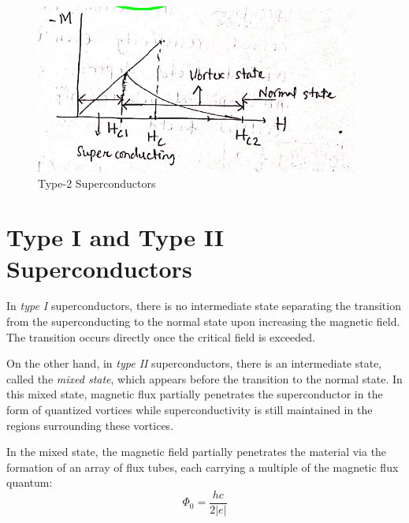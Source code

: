 \documentclass{article}
\begin{document}
\begin{figure}
    \begin{center}
        \includegraphics[width=0.95\textwidth]{figures/4.png}
    \end{center}
    \caption{Type-2 Superconductors}\label{fig:}
\end{figure}

\section{Type I and Type II Superconductors}

In \emph{type I} superconductors, there is no intermediate state separating the transition from the superconducting to the normal state upon increasing the magnetic field. The transition occurs directly once the critical field is exceeded.

On the other hand, in \emph{type II} superconductors, there is an intermediate state, called the \emph{mixed state}, which appears before the transition to the normal state. In this mixed state, magnetic flux partially penetrates the superconductor in the form of quantized vortices while superconductivity is still maintained in the regions surrounding these vortices.

In the mixed state, the magnetic field partially penetrates the material via the formation of an array of flux tubes, each carrying a multiple of the magnetic flux quantum:
\[
\Phi_0 = \frac{hc}{2|e|}
\]
\end{document}
